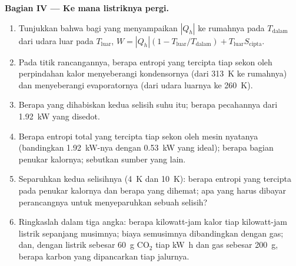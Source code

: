 \begin{problem}
\medskip
\noindent\textbf{Bagian IV --- Ke mana listriknya pergi.}
\begin{enumerate}[resume]
  \item Tunjukkan bahwa bagi  yang menyampaikan $|Q_h|$ ke rumahnya pada
        $T_{\mathrm{dalam}}$ dari udara luar pada $T_{\mathrm{luar}}$,
        $W = |Q_h|(1 - T_{\mathrm{luar}}/T_{\mathrm{dalam}}) + T_{\mathrm{luar}}S_{\mathrm{cipta}}$.
  \item Pada titik rancangannya, berapa entropi yang tercipta tiap sekon oleh perpindahan
        kalor menyeberangi kondensornya (dari \qty{313}{K} ke rumahnya) dan
        menyeberangi evaporatornya (dari udara luarnya ke \qty{260}{K}).
  \item Berapa  yang dihabiskan kedua selisih suhu itu; berapa pecahannya dari
        \qty{1.92}{kW} yang disedot.
  \item Berapa entropi total yang tercipta tiap sekon oleh mesin nyatanya (bandingkan
        \qty{1.92}{kW}-nya dengan \qty{0.53}{kW} yang ideal); berapa bagian
        penukar kalornya; sebutkan sumber yang lain.
  \item Separuhkan kedua selisihnya (\qty{4}{K} dan \qty{10}{K}): berapa entropi yang tercipta
        pada penukar kalornya dan berapa  yang dihemat; apa yang harus dibayar
        perancangnya untuk menyeparuhkan sebuah selisih?
  \item Ringkaslah dalam tiga angka: berapa kilowatt-jam kalor tiap
        kilowatt-jam listrik sepanjang musimnya; biaya semusimnya
        dibandingkan dengan gas; dan, dengan listrik sebesar \qty{60}{g} CO$_2$ tiap
        \unit{kW h} dan gas sebesar \qty{200}{g}, berapa karbon yang dipancarkan tiap
        jalurnya.
\end{enumerate}
\end{problem}
